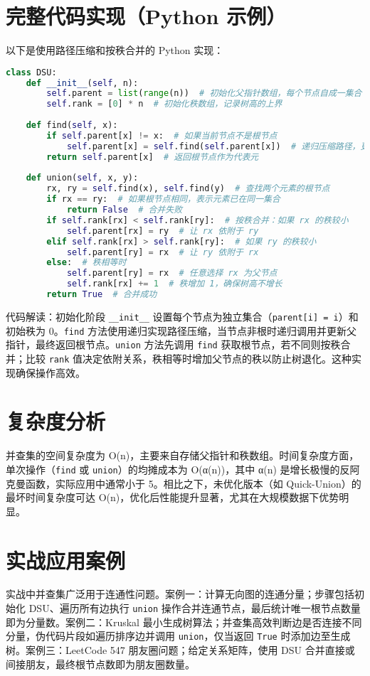 \chapter{完整代码实现（Python 示例）}
以下是使用路径压缩和按秩合并的 Python 实现：\par
\begin{lstlisting}[language=python]
class DSU:
    def __init__(self, n):
        self.parent = list(range(n))  # 初始化父指针数组，每个节点自成一集合
        self.rank = [0] * n  # 初始化秩数组，记录树高的上界
        
    def find(self, x):
        if self.parent[x] != x:  # 如果当前节点不是根节点
            self.parent[x] = self.find(self.parent[x])  # 递归压缩路径，更新父指针指向根节点
        return self.parent[x]  # 返回根节点作为代表元
        
    def union(self, x, y):
        rx, ry = self.find(x), self.find(y)  # 查找两个元素的根节点
        if rx == ry:  # 如果根节点相同，表示元素已在同一集合
            return False  # 合并失败
        if self.rank[rx] < self.rank[ry]:  # 按秩合并：如果 rx 的秩较小
            self.parent[rx] = ry  # 让 rx 依附于 ry
        elif self.rank[rx] > self.rank[ry]:  # 如果 ry 的秩较小
            self.parent[ry] = rx  # 让 ry 依附于 rx
        else:  # 秩相等时
            self.parent[ry] = rx  # 任意选择 rx 为父节点
            self.rank[rx] += 1  # 秩增加 1，确保树高不增长
        return True  # 合并成功
\end{lstlisting}
代码解读：初始化阶段 \texttt{\_{}\_{}init\_{}\_{}} 设置每个节点为独立集合（\texttt{parent[i] = i}）和初始秩为 0。\texttt{find} 方法使用递归实现路径压缩，当节点非根时递归调用并更新父指针，最终返回根节点。\texttt{union} 方法先调用 \texttt{find} 获取根节点，若不同则按秩合并；比较 \texttt{rank} 值决定依附关系，秩相等时增加父节点的秩以防止树退化。这种实现确保操作高效。\par
\chapter{复杂度分析}
并查集的空间复杂度为 O(n)，主要来自存储父指针和秩数组。时间复杂度方面，单次操作（\texttt{find} 或 \texttt{union}）的均摊成本为 O(α(n))，其中 α(n) 是增长极慢的反阿克曼函数，实际应用中通常小于 5。相比之下，未优化版本（如 Quick-Union）的最坏时间复杂度可达 O(n)，优化后性能提升显著，尤其在大规模数据下优势明显。\par
\chapter{实战应用案例}
实战中并查集广泛用于连通性问题。案例一：计算无向图的连通分量；步骤包括初始化 DSU、遍历所有边执行 \texttt{union} 操作合并连通节点，最后统计唯一根节点数量即为分量数。案例二：Kruskal 最小生成树算法；并查集高效判断边是否连接不同分量，伪代码片段如遍历排序边并调用 \texttt{union}，仅当返回 \texttt{True} 时添加边至生成树。案例三：LeetCode 547 朋友圈问题；给定关系矩阵，使用 DSU 合并直接或间接朋友，最终根节点数即为朋友圈数量。\par

